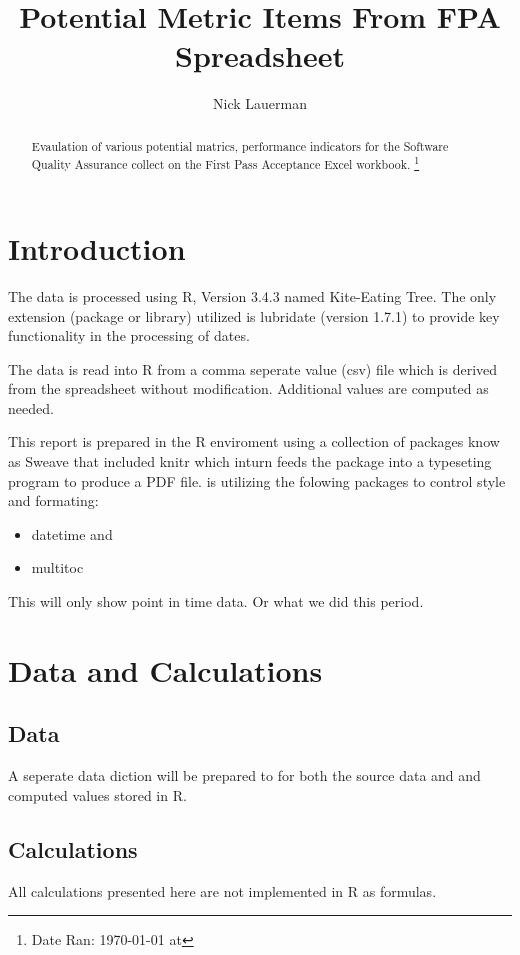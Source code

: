\documentclass{article}
\title{Potential Metric Items From FPA Spreadsheet}
\author{Nick Lauerman}
\begin{document}

\maketitle

\begin{abstract}
Evaulation of various potential matrics, performance indicators for the Software
Quality Assurance collect on the First Pass Acceptance Excel workbook.
\footnote{Date Ran: \today{} at \currenttime} %
\end{abstract}

\tableofcontents

\section{Introduction}
The data is processed using R, Version 3.4.3 named Kite-Eating Tree. The only
extension (package or library) utilized is lubridate (version 1.7.1) to provide
key functionality in the processing of dates.

The data is read into R from a comma seperate value (csv) file which is derived
from the spreadsheet without modification. Additional values are computed as needed.

This report is prepared in the R enviroment using a collection of packages know as
Sweave that included knitr which inturn feeds the package into \LaTeXe{} a typeseting
program to produce a PDF file. \LaTeXe{} is utilizing the folowing packages to control
style and formating:
\begin{itemize}
\item datetime and
\item multitoc
\end{itemize}

This will only show point in time data. Or what we did this period.

\section{Data and Calculations}
\subsection{Data}
A seperate data diction will be prepared to for both the source data
and and computed values stored in R.

\subsection{Calculations}
All calculations presented here are not implemented in R as formulas.
\end{document}

